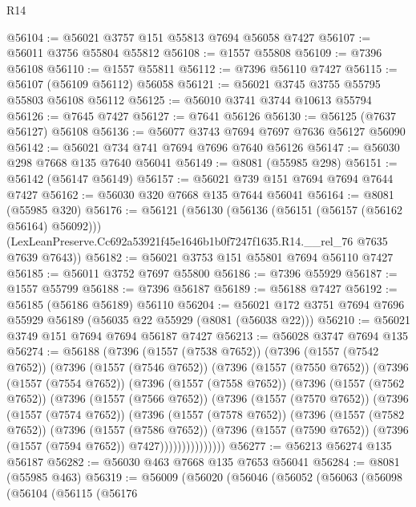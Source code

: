 \begin{lexlean}{R14}
\begin{coremodule}
@56104 := @56021 @3757 @151 @55813 @7694 @56058 @7427
@56107 := @56011 @3756 @55804 @55812
@56108 := @1557 @55808
@56109 := @7396 @56108
@56110 := @1557 @55811
@56112 := @7396 @56110 @7427
@56115 := @56107 (@56109 @56112) @56058
@56121 := @56021 @3745 @3755 @55795 @55803 @56108 @56112
@56125 := @56010 @3741 @3744 @10613 @55794
@56126 := @7645 @7427
@56127 := @7641 @56126
@56130 := @56125 (@7637 @56127) @56108
@56136 := @56077 @3743 @7694 @7697 @7636 @56127 @56090
@56142 := @56021 @734 @741 @7694 @7696 @7640 @56126
@56147 := @56030 @298 @7668 @135 @7640 @56041
@56149 := @8081 (@55985 @298)
@56151 := @56142 (@56147 @56149)
@56157 := @56021 @739 @151 @7694 @7694 @7644 @7427
@56162 := @56030 @320 @7668 @135 @7644 @56041
@56164 := @8081 (@55985 @320)
@56176 := @56121
    (@56130
      (@56136 (@56151 (@56157 (@56162 @56164) @56092)))
      (LexLeanPreserve.Cc692a53921f45e1646b1b0f7247f1635.R14.__rel_76 @7635 @7639 @7643))
@56182 := @56021 @3753 @151 @55801 @7694 @56110 @7427
@56185 := @56011 @3752 @7697 @55800
@56186 := @7396 @55929
@56187 := @1557 @55799
@56188 := @7396 @56187
@56189 := @56188 @7427
@56192 := @56185 (@56186 @56189) @56110
@56204 := @56021 @172 @3751 @7694 @7696 @55929 @56189 (@56035 @22 @55929 (@8081 (@56038 @22)))
@56210 := @56021 @3749 @151 @7694 @7694 @56187 @7427
@56213 := @56028 @3747 @7694 @135
@56274 := @56188
    (@7396
      (@1557 (@7538 @7652))
      (@7396
        (@1557 (@7542 @7652))
        (@7396
          (@1557 (@7546 @7652))
          (@7396
            (@1557 (@7550 @7652))
            (@7396
              (@1557 (@7554 @7652))
              (@7396
                (@1557 (@7558 @7652))
                (@7396
                  (@1557 (@7562 @7652))
                  (@7396
                    (@1557 (@7566 @7652))
                    (@7396
                      (@1557 (@7570 @7652))
                      (@7396
                        (@1557 (@7574 @7652))
                        (@7396
                          (@1557 (@7578 @7652))
                          (@7396
                            (@1557 (@7582 @7652))
                            (@7396
                              (@1557 (@7586 @7652))
                              (@7396
                                (@1557 (@7590 @7652))
                                (@7396 (@1557 (@7594 @7652)) @7427)))))))))))))))
@56277 := @56213 @56274 @135 @56187
@56282 := @56030 @463 @7668 @135 @7653 @56041
@56284 := @8081 (@55985 @463)
@56319 := @56009
    (@56020
      (@56046
        (@56052
          (@56063
            (@56098
              (@56104
                (@56115
                  (@56176

\end{coremodule}
\end{lexlean}
